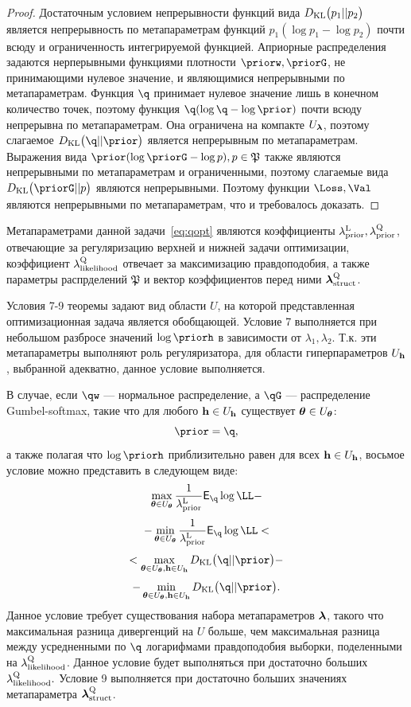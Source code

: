 \begin{proof}
Достаточным условием непрерывности функций вида $D_\text{KL}\bigl(p_1 || p_2\bigr)$ является непрерывность по метапараметрам функций $p_1 (\log{p_1} - \log{p_2})$  почти всюду и ограниченность интегрируемой функцией.  Априорные распределения задаются нерперывными функциями плотности $\priorw, \priorG$, не принимающими нулевое значение, и являющимися непрерывными по метапараметрам. Функция $\q$ принимает нулевое значение лишь в конечном количество точек, поэтому функция $\q (\log \q - \log \prior)$ почти всюду непрерывна по метапараметрам.  Она ограничена на компакте $U_{\boldsymbol{\lambda}}$, поэтому слагаемое $\KL{\q}{\prior}$ является непрерывным по метапараметрам.
Выражения вида $\prior (\log \priorG - \log p), p \in \mathfrak{P}$ также являются непрерывными по метапараметрам и ограниченными, поэтому слагаемые вида $\KL{\priorG}{p}$ являются непрерывными. Поэтому функции $\Loss, \Val$ являются непрерывными по метапараметрам, что и требовалось доказать.
\end{proof}
Метапараметрами данной задачи~\eqref{eq:qopt} являются коэффициенты $\lambda_\text{prior}^\text{L}, \lambda_\text{prior}^\text{Q}$, отвечающие за регуляризацию верхней и нижней задачи оптимизации, коэффициент $\lambda_\text{likelihood}^\text{Q}$ отвечает за максимизацию правдоподобия, а также параметры распрделений $\mathfrak{P}$ и вектор коэффициентов перед ними $\boldsymbol{\lambda}_\text{struct}^\text{Q}$. 

Условия 7-9 теоремы задают вид области $U$, на которой представленная оптимизационная задача является обобщающей. 
Условие 7 выполняется при небольшом разбросе значений $\log \priorh$ в зависимости от $\lambda_1, \lambda_2$. Т.к. эти метапараметры выполняют роль регуляризатора, для области гиперпараметров $U_{\mathbf{h}}$, выбранной адекватно, данное условие выполняется.

В случае, если $\qw$ --- нормальное распределение, а $\qG$ --- распределение Gumbel-softmax, такие что для любого $\mathbf{h} \in U_{\mathbf{h}}$ существует $\boldsymbol{\theta} \in U_{\boldsymbol{\theta}}$:
\[
    \prior = \q,
\]
а также полагая что $\log\priorh$ приблизительно равен для всех $\mathbf{h} \in U_{\mathbf{h}}$, восьмое условие можно представить в следующем виде:
\[
\max_{\teta \in \Uteta}\frac{1}{\lamCL}\E_{\q} \log \LL - 
\]
\[
 - \min_{\teta \in \Uteta}\frac{1}{\lamCL}\E_{\q} \log \LL  <
\]
\[ 
< \max_{\teta \in \Uteta, \h \in \Uh} \KL{\q}{\prior} -
\]
\[
-\min_{\teta \in \Uteta, \h \in \Uh} \KL{\q}{\prior}.
\]
Данное условие требует существования набора метапараметров $\boldsymbol{\lambda}$, такого что максимальная разница дивергенций на $U$ больше, чем максимальная разница между усредненными по $\q$ логарифмами правдоподобия выборки, поделенными на $\lambda_\text{likelihood}^\text{Q}$. Данное условие будет выполняться при достаточно больших $\lambda_\text{likelihood}^\text{Q}.$
Условие 9 выполняется при достаточно больших значениях метапараметра $\boldsymbol{\lambda}_\text{struct}^\text{Q}$. 




